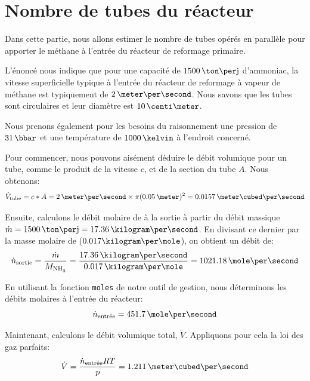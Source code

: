 \documentclass[a4paper,12pt]{article}
\begin{document}
\section{Nombre de tubes du réacteur}

Dans cette partie, nous allons estimer le nombre de tubes opérés
en parallèle pour apporter le méthane à l'entrée du réacteur de reformage primaire.

L’énoncé nous indique que pour une capacité de $1500\,\ton\per\jour$ d’ammoniac,
la vitesse superficielle typique à l’entrée du réacteur de reformage
à vapeur de méthane est typiquement de $2\,\meter\per\second$.
Nous savons que les tubes sont circulaires et leur diamètre est $10\,\centi\meter$.

Nous prenons également pour les besoins du raisonnement
une pression de $31\,\bbar$ et une température de $1000\,\kelvin$
à l'endroit concerné.

Pour commencer, nous pouvons aisément déduire le débit volumique pour un tube,
comme le produit de la vitesse $c$, et de la section du tube $A$.
Nous obtenons:
\begin{equation*}
    \dot{V}\ind{tube} = c*A = 2\,\meter\per\second \times \pi(0.05\,\meter)^2
    = 0.0157\,\meter\cubed\per\second
\end{equation*}

Ensuite, calculons le débit molaire de  à la sortie
à partir du débit massique $\dot{m} = 1500\,\ton\per\jour = 17.36\,\kilogram\per\second$.
En divisant ce dernier par la masse molaire de  ($0.017\kilogram\per\mole$),
on obtient un débit de:
\begin{equation*}
    \dot{n}\ind{sortie} = \frac{\dot{m}}{M_{\ce{NH3}}}
    = \frac{17.36\,\kilogram\per\second}{0.017\,\kilogram\per\mole}
    = 1021.18\,\mole\per\second
\end{equation*}

En utilisant la fonction \texttt{moles} de notre outil de gestion,
nous déterminons les débits molaires à l'entrée du réacteur:
\begin{equation*}
    \dot{n}\ind{entrée} = 451.7\,\mole\per\second
\end{equation*}

Maintenant, calculons le débit volumique total, $\dot{V}$.
Appliquons pour cela la loi des gaz parfaits:
\begin{equation*}
    \dot{V} = \frac{\dot{n}\ind{entrée}RT}{p} = 1.211\,\meter\cubed\per\second
\end{equation*}
\end{document}
